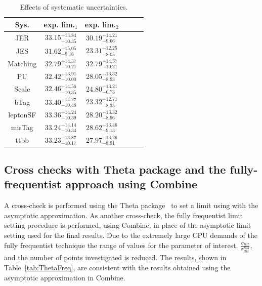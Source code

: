 \begin{table}[ht!]
\small
\centering
\begin{tabular}{|c |c |c | c | c | c |}
\hline
 Sys. &  exp. lim.$_{1}$ & exp. lim.$_{2}$   \\
 \hline   
 JER &    $33.15^{+13.84}_{-10.35}$  &  $30.19^{+14.21}_{-9.66}$    \\
 \hline  
 JES  & $31.62^{+15.05}_{-9.16}$ &  $23.31^{+12.25}_{-8.05}$     \\
\hline  
Matching &  $32.79^{+14.37}_{-10.21}$ & $32.79^{+14.37}_{-10.21}$     \\  
 \hline  
 PU    &  $32.42^{+13.91}_{-10.00}$  &  $28.05^{+13.32}_{-8.93}$    \\
 \hline  
 Scale  &  $32.46^{+14.56}_{-10.35}$ & $24.80^{+13.21}_{-6.73}$       \\
 \hline  
 bTag &  $33.40^{+14.27}_{-10.48}$ & $23.32^{+12.71}_{-8.35}$       \\
 \hline  
 leptonSF &  $33.36^{+14.24}_{-10.39}$  &  $28.20^{+13.32}_{-8.96}$   \\  
 \hline  
 misTag &  $33.24^{+14.14}_{-10.34}$  &  $28.62^{+13.46}_{-9.13}$  \\
 \hline  
 ttbb  &  $33.23^{+13.87}_{-10.17}$  &  $27.97^{+13.26}_{-8.91}$  \\
 \hline
\end{tabular}
\caption{Effects of systematic uncertainties. }
\label{tab:effectLims}
\end{table}

\subsection{Cross checks with Theta package and the fully-frequentist approach using Combine}

A cross-check is performed using the Theta package~\cite{theta} to set a limit using \CLS with the asymptotic approximation. As another cross-check, the fully frequentist \CLS limit setting procedure is performed, using Combine, in place of the asymptotic limit setting used for the final results. Due to the extremely large CPU demands of the fully frequentist technique the range of values for the parameter of interest, $\frac{\sigma_{tttt}}{\sigma_{tttt}^{SM}}$, and the number of points investigated is reduced. The results, shown in Table~\ref{tab:ThetaFreq}, are consistent with the results obtained using the asymptotic approximation in Combine.


